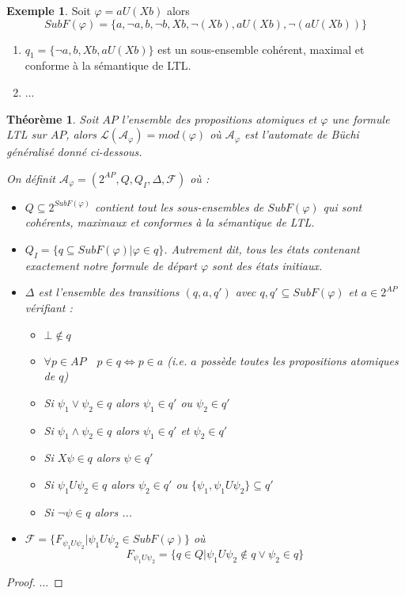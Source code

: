 \documentclass[12pt,a4paper]{article}
\theoremstyle{plain}
\newtheorem{thm}{Théorème}
\theoremstyle{definition}
\newtheorem{ex}{Exemple}
\begin{document}
\begin{ex}
  Soit $\varphi = a U (Xb)$ alors
  \[
    SubF(\varphi) = \{a, \lnot a, b, \lnot b, Xb, \lnot (Xb), a U (Xb), \lnot (aU(Xb))\}
  \]
  \begin{enumerate}
  \item $q_1 = \{\lnot a, b, Xb, a U (Xb)\}$ est un sous-ensemble cohérent, maximal et conforme à la sémantique de LTL.
  \item ...
  \end{enumerate}
\end{ex}

\begin{thm}
  Soit $AP$ l'ensemble des propositions atomiques et $\varphi$ une formule LTL sur $AP$, alors $\mathcal{L}(\mathcal{A}_\varphi) = mod(\varphi)$
  où $\mathcal{A}_\varphi$ est l'automate de Büchi généralisé donné ci-dessous.

  On définit $\mathcal{A}_\varphi = (2^{AP}, Q, Q_I, \Delta, \mathscr{F})$ où :
  \begin{itemize}
  \item $Q \subseteq 2^{SubF(\varphi)}$ contient tout les sous-ensembles de $SubF(\varphi)$ qui sont cohérents, maximaux et conformes à la sémantique de LTL.
  \item $Q_I = \{ q \subseteq SubF(\varphi) | \varphi \in q \}$. Autrement dit, tous les états contenant exactement notre formule de départ $\varphi$ sont des états initiaux.
  \item $\Delta$ est l'ensemble des transitions $(q, a, q')$ avec $q, q' \subseteq SubF(\varphi)$ et $a \in 2^{AP}$ vérifiant :
    \begin{itemize}
    \item $\bot \not \in q$
    \item $\forall p \in AP \quad p \in q \iff p \in a$ (i.e. $a$ possède toutes les propositions atomiques de $q$)
    \item Si $\psi_1 \lor \psi_2 \in q$ alors $\psi_1 \in q'$ ou $\psi_2 \in q'$
    \item Si $\psi_1 \land \psi_2 \in q$ alors $\psi_1 \in q'$ et $\psi_2 \in q'$
    \item Si $X\psi \in q$ alors $\psi \in q'$
    \item Si $\psi_1 U \psi_2 \in q$ alors $\psi_2 \in q'$ ou $\{\psi_1, \psi_1 U \psi_2\} \subseteq q'$
    \item Si $\lnot \psi \in q$ alors ...
    \end{itemize}
  \item $\mathscr{F} = \{F_{\psi_1 U \psi_2} | \psi_1 U \psi_2 \in SubF(\varphi)\}$ où
    \[
      F_{\psi_1 U \psi_2} = \{q \in Q | \psi_1 U \psi_2 \not \in q \lor \psi_2\in q \}
    \]
  \end{itemize}
\end{thm}

\begin{proof}
  ...
\end{proof}
\end{document}
